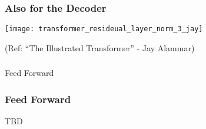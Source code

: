\begin{frame}[fragile]\frametitle{Also for the Decoder}

\begin{center}
\texttt{[image: transformer\_resideual\_layer\_norm\_3\_jay]}


{\tiny (Ref: ``The Illustrated Transformer'' - Jay Alammar)}
\end{center}		

\end{frame}

\begin{frame}[fragile]\frametitle{}
\begin{center}
{\Large Feed Forward}
\end{center}
\end{frame}

\begin{frame}[fragile]\frametitle{Feed Forward}

TBD
\end{frame}


			
			
		


			
			
		


